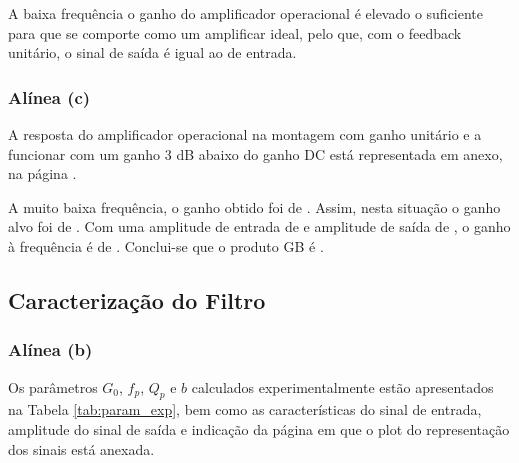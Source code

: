 
A baixa frequência o ganho do amplificador operacional é elevado o suficiente para que se comporte como um amplificar ideal, pelo que, com o feedback unitário, o sinal de saída é igual ao de entrada.

\subsubsection*{Alínea (c)}

A resposta do amplificador operacional na montagem com ganho unitário e a funcionar com um ganho 3 dB abaixo do ganho DC está representada em anexo, na página \quad\quad\quad.



A muito baixa frequência, o ganho obtido foi de \quad\quad\quad. Assim, nesta situação o ganho alvo foi de \quad\quad\quad. Com uma amplitude de entrada de \quad\quad\quad e amplitude de saída de \quad\quad\quad, o ganho à frequência \quad\quad\quad é de \quad\quad\quad. Conclui-se que o produto GB é \quad\quad\quad.

\subsection{Caracterização do Filtro}

\subsubsection*{Alínea (b)}

Os parâmetros $G_0$, $f_p$, $Q_p$ e $b$ calculados experimentalmente estão apresentados na Tabela \ref{tab:param_exp}, bem como as características do sinal de entrada, amplitude do sinal de saída e indicação da página em que o plot do representação dos sinais está anexada.

